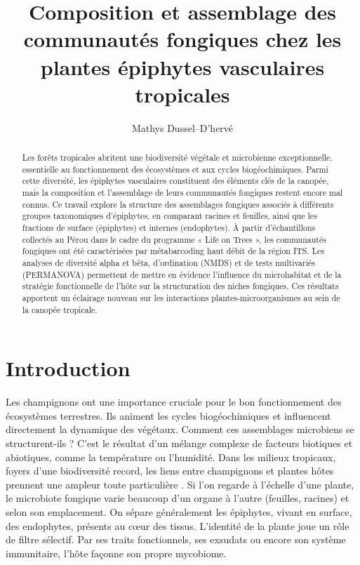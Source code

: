 \documentclass[alpha-refs,twocolumn]{wiley-article}
\title{Composition et assemblage des communautés fongiques chez les plantes épiphytes vasculaires tropicales}
\author[1\authfn{1}]{Mathys Dussel--D'hervé}
\affil[1]{Faculté de Sciences et Ingénieurie - Université de Toulouse III - Paul Sabatier, 118 route de Narbonne, 31062 Toulouse Cedex 9, France}
\begin{document}
\begin{frontmatter}
\maketitle

\begin{abstract}
Les forêts tropicales abritent une biodiversité végétale et microbienne exceptionnelle, essentielle au fonctionnement des écosystèmes et aux cycles biogéochimiques. Parmi cette diversité, les épiphytes vasculaires constituent des éléments clés de la canopée, mais la composition et l’assemblage de leurs communautés fongiques restent encore mal connus. Ce travail explore la structure des assemblages fongiques associés à différents groupes taxonomiques d’épiphytes, en comparant racines et feuilles, ainsi que les fractions de surface (épiphytes) et internes (endophytes). À partir d’échantillons collectés au Pérou dans le cadre du programme « Life on Trees », les communautés fongiques ont été caractérisées par métabarcoding haut débit de la région ITS. Les analyses de diversité alpha et bêta, d’ordination (NMDS) et de tests multivariés (PERMANOVA) permettent de mettre en évidence l’influence du microhabitat et de la stratégie fonctionnelle de l’hôte sur la structuration des niches fongiques. Ces résultats apportent un éclairage nouveau sur les interactions plantes-microorganismes au sein de la canopée tropicale.

\end{abstract}
\end{frontmatter}

\section{Introduction}


Les champignons ont une importance cruciale pour le bon fonctionnement des écosystèmes terrestres. Ils animent les cycles biogéochimiques et influencent directement la dynamique des végétaux. Comment ces assemblages microbiens se structurent-ils ? C'est le résultat d'un mélange complexe de facteurs biotiques et abiotiques, comme la température ou l'humidité. Dans les milieux tropicaux, foyers d'une biodiversité record, les liens entre champignons et plantes hôtes prennent une ampleur toute particulière \citep{arnold_are_2000, bermudes_fungi_1989}. Si l'on regarde à l'échelle d'une plante, le microbiote fongique varie beaucoup d'un organe à l'autre (feuilles, racines) et selon son emplacement. On sépare généralement les épiphytes, vivant en surface, des endophytes, présents au cœur des tissus. L'identité de la plante joue un rôle de filtre sélectif. Par ses traits fonctionnels, ses exsudats ou encore son système immunitaire, l'hôte façonne son propre mycobiome.
\end{document}
